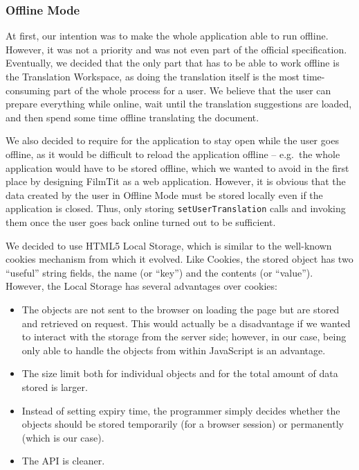 {\subsubsection{Offline Mode}
\label{ip:subsubsec:offline}

At first, our intention was to make the whole application able to run offline. However, it was not a priority and was not even part of the official specification.
Eventually, we decided that the only part that has to be able to work offline is the Translation Workspace, as doing the translation itself is the most time-consuming part of the whole process for a user. We believe that the user can prepare everything while online, wait until the translation suggestions are loaded, and then spend some time offline translating the document.

We also decided to require for the application to stay open while the user goes offline, as it would be difficult to reload the application offline
-- e.g.\ the whole application would have to be stored offline, which we wanted to avoid in the first place by designing FilmTit as a web application.
However, it is obvious that the data created by the user in Offline Mode must be stored locally even if the application is closed.
Thus, only storing {\tt setUserTranslation} calls and invoking them once the user goes back online turned out to be sufficient.


We decided to use HTML5 Local Storage, which is similar to the well-known cookies mechanism from which it evolved.
Like Cookies, the stored object has two ``useful'' string fields, the name (or ``key'') and the contents (or ``value'').
However, the Local Storage has several advantages over cookies:

\begin{itemize}
\item The objects are not sent to the browser on loading the page but are stored and retrieved on request. This would actually be a disadvantage if we wanted to interact with the storage from the server side; however, in our case, being only able to handle the objects from within JavaScript is an advantage.
\item The size limit both for individual objects and for the total amount of data stored is larger.
\item Instead of setting expiry time, the programmer simply decides whether the objects should be stored temporarily (for a browser session) or permanently (which is our case).
\item The API is cleaner.
\end{itemize}

}
